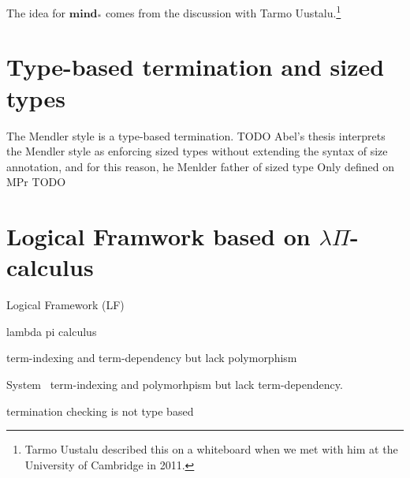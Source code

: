 The idea for $\textbf{mind}_{*}$ comes from
the discussion with Tarmo Uustalu.\footnote{
     Tarmo Uustalu described this on a whiteboard
     when we met with him at the University of Cambridge in 2011.}

\section{Type-based termination and sized types}
The Mendler style is a type-based termination. TODO
Abel's thesis interprets the Mendler style as
enforcing sized types without extending the syntax of size annotation,
and for this reason, he Menlder father of sized type
Only defined on MPr
TODO

\section{Logical Framwork based on $\lambda\Pi$-calculus}

Logical Framework (LF)

lambda pi calculus

term-indexing and term-dependency 
but lack polymorphism

System \Fi\
term-indexing and polymorhpism
but lack term-dependency.


termination checking is not type based


